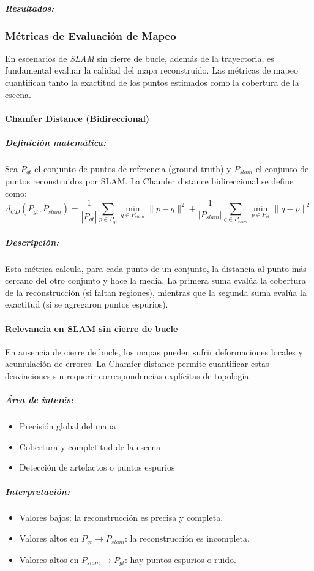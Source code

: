 \documentclass[12pt, a4paper, twoside]{article}
\begin{document}
\subparagraph{Resultados:}

\subsubsection{Métricas de Evaluación de Mapeo}

En escenarios de \textit{SLAM} sin cierre de bucle, además de la trayectoria, 
es fundamental evaluar la calidad del mapa reconstruido. 
Las métricas de mapeo cuantifican tanto la exactitud de los puntos estimados 
como la cobertura de la escena.

\paragraph{Chamfer Distance (Bidireccional)}

\subparagraph{Definición matemática:}
Sea $P_{gt}$ el conjunto de puntos de referencia (ground-truth) 
y $P_{slam}$ el conjunto de puntos reconstruidos por SLAM. 
La Chamfer distance bidireccional se define como:
\[
d_{CD}(P_{gt}, P_{slam}) = \frac{1}{|P_{gt}|} \sum_{p \in P_{gt}} 
\min_{q \in P_{slam}} \|p - q\|^2
+
\frac{1}{|P_{slam}|} \sum_{q \in P_{slam}} 
\min_{p \in P_{gt}} \|q - p\|^2
\]
\subparagraph{Descripción:}
Esta métrica calcula, para cada punto de un conjunto, la distancia al punto más cercano del otro conjunto y 
hace la media. La primera suma evalúa la cobertura de la reconstrucción (si faltan regiones), mientras que la 
segunda suma evalúa la exactitud (si se agregaron puntos espurios).

\paragraph{Relevancia en SLAM sin cierre de bucle}
En ausencia de cierre de bucle, los mapas pueden sufrir deformaciones locales y acumulación de errores. 
La Chamfer distance permite cuantificar estas desviaciones sin requerir correspondencias explícitas de topología.

\subparagraph{Área de interés:}
\begin{itemize}
  \item Precisión global del mapa
  \item Cobertura y completitud de la escena
  \item Detección de artefactos o puntos espurios
\end{itemize}

\subparagraph{Interpretación:}
\begin{itemize}
  \item Valores bajos: la reconstrucción es precisa y completa.  
  \item Valores altos en $P_{gt} \to P_{slam}$: la reconstrucción es incompleta.
  \item Valores altos en $P_{slam} \to P_{gt}$: hay puntos espurios o ruido.
\end{itemize}
\end{document}
